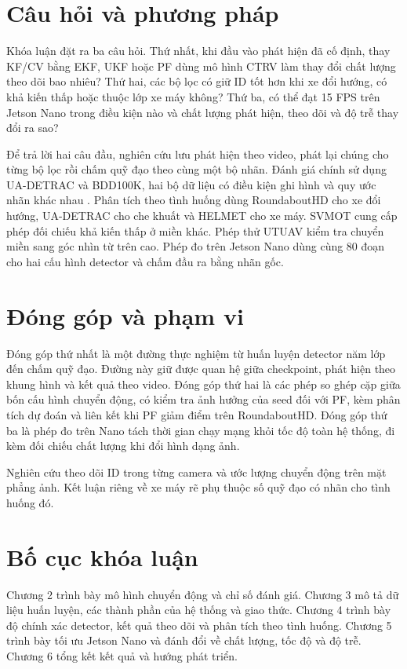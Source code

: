 \section{Câu hỏi và phương pháp}
Khóa luận đặt ra ba câu hỏi. Thứ nhất, khi đầu vào phát hiện đã cố định, thay KF/CV bằng EKF, UKF hoặc PF dùng mô hình CTRV làm thay đổi chất lượng theo dõi bao nhiêu? Thứ hai, các bộ lọc có giữ ID tốt hơn khi xe đổi hướng, có khả kiến thấp hoặc thuộc lớp xe máy không? Thứ ba, có thể đạt 15 FPS trên Jetson Nano trong điều kiện nào và chất lượng phát hiện, theo dõi và độ trễ thay đổi ra sao?

Để trả lời hai câu đầu, nghiên cứu lưu phát hiện theo video, phát lại chúng cho từng bộ lọc rồi chấm quỹ đạo theo cùng một bộ nhãn. Đánh giá chính sử dụng UA-DETRAC và BDD100K, hai bộ dữ liệu có điều kiện ghi hình và quy ước nhãn khác nhau \cite{detrac,bdd}. Phân tích theo tình huống dùng RoundaboutHD cho xe đổi hướng, UA-DETRAC cho che khuất và HELMET cho xe máy. SVMOT cung cấp phép đối chiếu khả kiến thấp ở miền khác. Phép thử UTUAV kiểm tra chuyển miền sang góc nhìn từ trên cao. Phép đo trên Jetson Nano dùng cùng 80 đoạn cho hai cấu hình detector và chấm đầu ra bằng nhãn gốc.

\section{Đóng góp và phạm vi}
Đóng góp thứ nhất là một đường thực nghiệm từ huấn luyện detector năm lớp đến chấm quỹ đạo. Đường này giữ được quan hệ giữa checkpoint, phát hiện theo khung hình và kết quả theo video. Đóng góp thứ hai là các phép so ghép cặp giữa bốn cấu hình chuyển động, có kiểm tra ảnh hưởng của seed đối với PF, kèm phân tích dự đoán và liên kết khi PF giảm điểm trên RoundaboutHD. Đóng góp thứ ba là phép đo trên Nano tách thời gian chạy mạng khỏi tốc độ toàn hệ thống, đi kèm đối chiếu chất lượng khi đổi hình dạng ảnh.

Nghiên cứu theo dõi ID trong từng camera và ước lượng chuyển động trên mặt phẳng ảnh. Kết luận riêng về xe máy rẽ phụ thuộc số quỹ đạo có nhãn cho tình huống đó.

\section{Bố cục khóa luận}
Chương 2 trình bày mô hình chuyển động và chỉ số đánh giá. Chương 3 mô tả dữ liệu huấn luyện, các thành phần của hệ thống và giao thức. Chương 4 trình bày độ chính xác detector, kết quả theo dõi và phân tích theo tình huống. Chương 5 trình bày tối ưu Jetson Nano và đánh đổi về chất lượng, tốc độ và độ trễ. Chương 6 tổng kết kết quả và hướng phát triển.
